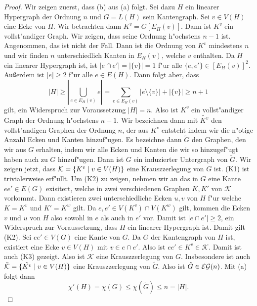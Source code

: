 \begin{proof}
  Wir zeigen zuerst, dass (b) aus (a) folgt. Sei dazu $H$ ein linearer Hypergraph der Ordnung $n$ und $G=L(H)$ sein Kantengraph. Sei $v\in V(H)$ eine Ecke von $H$. Wir betrachten dann $K^{v} = G[E_H(v)]$. Dann ist $K^{v}$ ein vollst"andiger Graph. Wir zeigen, dass seine Ordnung h"ochstens $n-1$ ist. Angenommen, das ist nicht der Fall. Dann ist die Ordnung von $K^{v}$ mindestens $n$ und wir finden $n$ unterschiedlich Kanten in $E_H(v)$, welche $v$ enthalten. 
  Da $H$ ein linearer Hypergraph ist, ist $|e\cap e'| = |\{ v \}| = 1$ f"ur alle $\{e,e'\} \in [E_H(v)]^{2}$. Au{\ss}erdem ist $|e| \geq 2$ f"ur alle $e\in E(H)$. 
  Dann folgt aber, dass $$|H| \geq |\bigcup\limits_{e\in E_H(v)} e| = \sum\limits_{e\in E_{H}(v)} |e\setminus \{v\}|+ | \{v\}| \geq n+1$$ gilt, ein Widerspruch zur Voraussetzung $|H| = n$. 
  Also ist $K^{v}$ ein vollst"andiger Graph der Ordnung h"ochstens $n-1$. Wir bezeichnen dann mit $\tilde{K^{v}}$ den vollst"andigen Graphen der Ordnung $n$, der aus $K^{v}$ entsteht indem wir die n"otige Anzahl Ecken und Kanten hinzuf"ugen. 
  Es bezeichne dann $\tilde{G}$ den Graphen, den wir aus $G$ erhalten, indem wir alle Ecken und Kanten die wir so hinzugef"ugt haben auch zu $G$ hinzuf"ugen. 
  Dann ist $G$ ein induzierter Untergraph von $\tilde{G}$. 
  Wir zeigen jetzt, dass $\mathcal{K}= \{K^{v} \;|\; v\in V(H) \}$ eine Krauszzerlegung von $G$ ist. 
  (K1) ist trivialerweise erf"ullt. Um (K2) zu zeigen, nehmen wir an das in $G$ eine Kante $ee'\in E(G)$ exisitert, welche in zwei verschiedenen Graphen $K,K'$ von $\mathcal{K}$ vorkommt.
  Dann existieren zwei unterschiedliche Ecken $u,v$ von $H$ f"ur welche $K= K^{v}$ und $K' = K^{w}$ gilt. 
  Da $e,e'\in V(K^{v}) \cap V(K^{w})$ gilt, kommen die Ecken $v$ und $u$ von $H$ also sowohl in $e$ als auch in $e'$ vor. Damit ist $|e\cap e'| \geq 2$, ein Widerspruch zur Voraussetzung, dass $H$ ein linearer Hypergraph ist. Damit gilt (K2).
  Sei $ee'\in V(G)$ eine Kante von $G$. Da $G$ der Kantengraph von $H$ ist, existiert eine Ecke $v\in V(H)$ mit $ v\in e\cap e'$. 
  Also ist $ee'\in K^{v}\in \mathcal{K}$. Damit ist auch (K3) gezeigt. Also ist $\mathcal{K}$ eine Krauszzerlegung von $G$. Insbesondere ist auch $\tilde{\mathcal{K}} = \{\tilde{K^{v}} \;|\; v\in V(H) \}$ eine Krauszzerlegung von $\tilde{G}$. Also ist $\tilde{G}\in {\cal EG}(n)$. Mit (a) folgt dann $$ \chi'(H) = \chi(G) \leq \chi(\tilde{G}) \leq n = |H|.$$
  

\end{proof}
